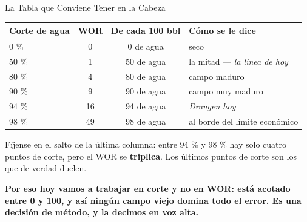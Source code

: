 \documentclass[aspectratio=169, 11pt]{beamer}
\begin{document}
\begin{frame}[shrink=8]{La Tabla que Conviene Tener en la Cabeza}
  \vspace{6pt}
  \begin{center}
  {\footnotesize
  \begin{tabular}{lccl}
    \toprule
    \textbf{Corte de agua} & \textbf{WOR} & \textbf{De cada 100 bbl} &
    \textbf{Cómo se le dice} \\
    \midrule
    0 \%   & 0   & 0 de agua   & seco \\
    50 \%  & 1   & 50 de agua  & la mitad --- \emph{la línea de hoy} \\
    80 \%  & 4   & 80 de agua  & campo maduro \\
    90 \%  & 9   & 90 de agua  & campo muy maduro \\
    94 \%  & 16  & 94 de agua  & \emph{Draugen hoy} \\
    98 \%  & 49  & 98 de agua  & al borde del límite económico \\
    \bottomrule
  \end{tabular}}
  \end{center}
  \vspace{9pt}
  {\footnotesize\color{textMuted}
   Fíjense en el salto de la última columna: entre 94 \% y 98 \% hay solo
   cuatro puntos de corte, pero el WOR se \textbf{triplica}. Los últimos
   puntos de corte son los que de verdad duelen.}
  \vspace{6pt}

  {\footnotesize\color{arcaDark}\bfseries
   Por eso hoy vamos a trabajar en \textbf{corte} y no en WOR: está acotado
   entre 0 y 100, y así ningún campo viejo domina todo el error. Es una
   decisión de método, y la decimos en voz alta.}
\end{frame}
\end{document}
